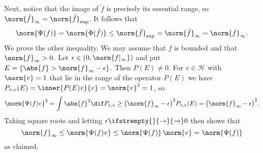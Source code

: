\documentclass[article, a4paper, 11pt, oneside]{memoir}
\numberwithin{equation}{chapter}
\newcommand{\calH}{\mathcal{H}}
\renewcommand\to[1][]{%
    \ifstrempty{#1}{%
        \rightarrow
    }{%
        \xrightarrow[#1]{}
    }%
}
\begin{document}
Next, notice that the image of $\tilde f$ is precisely its essential range, so $\norm{\tilde f}_\infty = \norm{\tilde f}_{\sup}$. It follows that
%
\begin{equation*}
    \norm{\Psi(f)}
        = \norm{\Phi(\tilde f)}
        \leq \norm{\tilde f}_{\sup}
        = \norm{\tilde f}_\infty
        = \norm{f}_\infty.
\end{equation*}
%
We prove the other inequality. We may assume that $f$ is bounded and that $\norm{f}_\infty > 0$. Let $\epsilon \in (0, \norm{f]_\infty})$ and put $E = \{ \abs{f} > \norm{f}_\infty - \epsilon \}$. Then $P(E) \neq 0$. For $v \in \calH$ with $\norm{v} = 1$ that lie in the range of the operator $P(E)$ we have $P_{v,v}(E) = \inner{P(E)v}{v} = \norm{v}^2 = 1$, so
%
\begin{equation*}
    \norm{\Psi(f)v}^2
        = \int \abs{f}^2 \dif P_{v,v}
        \geq \bigl( \norm{f}_\infty - \epsilon \bigr)^2 P_{v,v}(E)
        = \bigl( \norm{f}_\infty - \epsilon \bigr)^2.
\end{equation*}
%
Taking square roots and letting $\epsilon \to 0$ then shows that
%
\begin{equation*}
    \norm{f}_\infty
        \leq \norm{\Psi(f)v}
        \leq \norm{\Psi(f)} \, \norm{v}
        = \norm{\Psi(f)}
\end{equation*}
%
as claimed.


\nocite{*}

\printbibliography
\end{document}

